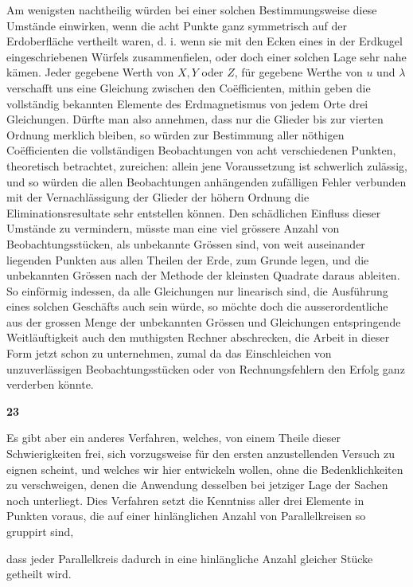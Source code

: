 \expandafter\def\csname HistoricalNoteText18\endcsname{Am wenigsten nachtheilig würden bei einer solchen Bestimmungsweise diese Umstände einwirken, wenn die acht Punkte ganz symmetrisch auf der Erdoberfläche vertheilt waren, d. i. wenn sie mit den Ecken eines in der Erdkugel eingeschriebenen Würfels zusammenfielen, oder doch einer solchen Lage sehr nahe kämen.}
Jeder gegebene Werth von $X,Y$ oder $Z$, für gegebene Werthe von $u$ und $\lambda$ verschafft uns eine Gleichung zwischen den Coëfficienten, mithin geben die vollständig bekannten Elemente des Erdmagnetismus von jedem Orte drei Gleichungen. Dürfte man also annehmen, dass nur die Glieder bis zur vierten Ordnung merklich bleiben, so würden zur Bestimmung aller nöthigen Coëfficienten die vollständigen Beobachtungen von acht verschiedenen Punkten, theoretisch betrachtet, zureichen: allein jene Voraussetzung ist schwerlich zulässig, und so würden die allen Beobachtungen anhängenden zufälligen Fehler verbunden mit der Vernachlässigung der Glieder der höhern Ordnung die Eliminationsresultate sehr entstellen können. Den schädlichen Einfluss dieser Umstände zu vermindern, müsste man eine viel grössere Anzahl von Beobachtungsstücken, als unbekannte Grössen sind, von weit auseinander liegenden Punkten aus allen Theilen der Erde, zum Grunde legen, und die unbekannten Grössen nach der Methode der kleinsten Quadrate daraus ableiten. So einförmig indessen, da alle Gleichungen nur linearisch sind, die Ausführung eines solchen Geschäfts auch sein würde, so möchte doch die ausserordentliche aus der grossen Menge der unbekannten Grössen und Gleichungen entspringende Weitläuftigkeit auch den muthigsten Rechner abschrecken, die Arbeit in dieser Form jetzt schon zu unternehmen, zumal da das Einschleichen von unzuverlässigen Beobachtungsstücken oder von Rechnungsfehlern den Erfolg ganz verderben könnte.

{\renewcommand{\Article}[1]{\par\medskip\Needspace{4\baselineskip}\pdfbookmark[1]{Art. #1}{erdmagnetismus-art-#1}\centerline{\textbf{#1}}\nobreak\smallskip}\Article{23}}
Es gibt aber ein anderes Verfahren, welches, von einem Theile dieser Schwierigkeiten frei, sich vorzugsweise für den ersten anzustellenden Versuch zu eignen scheint, und welches wir hier entwickeln wollen, ohne die Bedenklichkeiten zu verschweigen, denen die Anwendung desselben bei jetziger Lage der Sachen noch unterliegt. Dies Verfahren setzt die Kenntniss aller drei Elemente in Punkten voraus, die auf einer hinlänglichen Anzahl von Parallelkreisen so gruppirt sind,
\par\clearpage
{}
\noindent dass jeder Parallelkreis dadurch in eine hinlängliche Anzahl gleicher Stücke getheilt wird.

